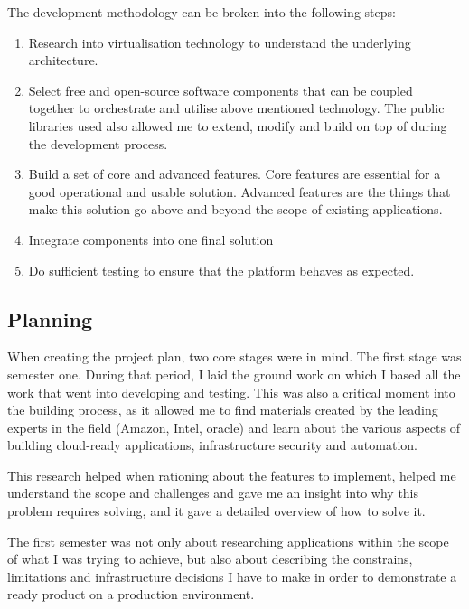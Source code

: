 \documentclass{article}
\begin{document}
	The development methodology can be broken into the following steps:
	\begin{enumerate}
		\item
		Research into virtualisation technology to understand the underlying architecture.
		
		\item
		Select free and open-source software components that can be coupled together to orchestrate and utilise above mentioned technology. The public libraries used also allowed me to extend, modify and build on top of during the development process.
		
		\item
		Build a set of core and advanced features. Core features are essential for a good operational and usable solution. Advanced features are the things that make this solution go above and beyond the scope of existing applications.
		
		\item
		Integrate components into one final solution
		
		\item
		Do sufficient testing to ensure that the platform behaves as expected.
	\end{enumerate}

  \subsection{Planning}
  When creating the project plan, two core stages were in mind. The first stage was semester one. During that period, I laid the ground work on which I based all the work that went into developing and testing. This was also a critical moment into the building process, as it allowed me to find materials created by the leading experts in the field (Amazon, Intel, oracle) and learn about the various aspects of building cloud-ready applications, infrastructure security and automation. 
  
  This research helped when rationing about the features to implement, helped me understand the scope and challenges and gave me an insight into why this problem requires solving, and it gave a detailed overview of how to solve it.
  
  The first semester was not only about researching applications within the scope of what I was trying to achieve, but also about describing the constrains, limitations and infrastructure decisions I have to make in order to demonstrate a ready product on a production environment. 
  
\end{document}
